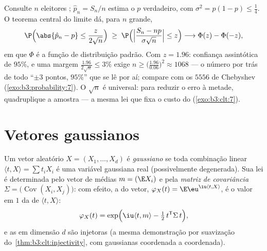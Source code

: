 \begin{example}
\label{ex:b3:clt:confidence}
Consulte $n$ eleitores ; $\hat p_n = S_n/n$ estima o $p$
verdadeiro, com $\sigma^2 = p(1-p) \leq \frac14$. O teorema central do limite dá, para $n$
grande,
\[
\P\Bigl(\abs{\hat p_n - p} \leq
\frac{z}{2\sqrt n}\Bigr)
\;\geq\; \P\Bigl(\Bigl|\frac{S_n - np}{\sigma\sqrt n}\Bigr|
\leq z\Bigr)
\longrightarrow \Phi(z) - \Phi(-z),
\]
em que $\Phi$ é a função de distribuição  padrão. Com
$z = 1.96$: confiança assintótica de $95\%$, e uma margem $\frac{1.96}{2\sqrt n} \leq 3\%$ exige
$n \geq
\bigl(\frac{1.96}{0.06}\bigr)^2 \approx 1068$ --- o número por trás de todo ``$\pm3$ pontos, $95\%$'' que
se lê por aí; compare com os $5556$ de Chebyshev
(\cref{exo:b3:probability:7}). O $\sqrt n$ é universal: para reduzir o erro à metade,
quadruplique a amostra --- a mesma lei que fixa o custo do 
(\cref{exo:b3:clt:7}).
\end{example}

\section{Vetores gaussianos}

\begin{definition}\label{def:b3:clt:gaussianvector}
Um vetor aleatório $X = (X_1, \dots, X_d)$ é \emph{gaussiano} se
toda combinação linear $\langle t, X\rangle = \sum t_iX_i$ é uma variável gaussiana real (possivelmente
degenerada). Sua lei é determinada pelo vetor de médias $m = (\E X_i)$ e pela
\emph{matriz de covariância} $\Sigma = \bigl(\operatorname{Cov}
(X_i, X_j)\bigr)$: com efeito, a 
do vetor, $\varphi_X(t) = \E\eu^{\iu\langle t, X\rangle}$, é o valor em $1$ da  de $\langle t, X\rangle$:
\[
\varphi_X(t) = \exp\Bigl(\iu\langle t, m\rangle -
\tfrac12\,t^{\mathsf T}\Sigma\,t\Bigr),
\]
e as  em dimensão $d$ são injetoras (a mesma
demonstração por suavização do~\cref{thm:b3:clt:injectivity}, com gaussianas coordenada
a coordenada).
\end{definition}

